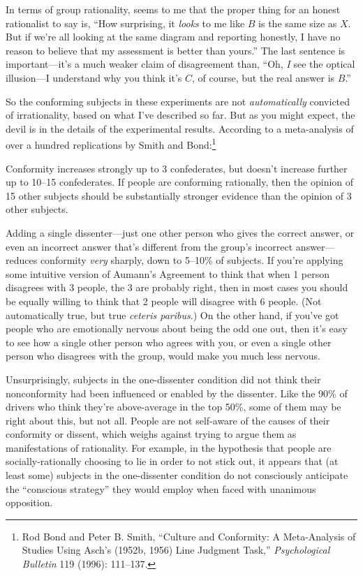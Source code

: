 {
 In terms of group rationality, seems to me that the proper thing
for an honest rationalist to say is, ``How surprising,
it \textit{looks} to me like $B$ is the same size as $X$. But if
we're all looking at the same diagram and reporting
honestly, I have no reason to believe that my assessment is better than
yours.'' The last sentence is
important---it's a much weaker claim of disagreement
than, ``Oh, \textit{I} see the optical illusion---I
understand why you think it's $C$, of course, but the
real answer is $B$.''}

{
 So the conforming subjects in these experiments are not
\textit{automatically} convicted of irrationality, based on what
I've described so far. But as you might expect, the
devil is in the details of the experimental results. According to a
meta-analysis of over a hundred replications by Smith and
Bond:\footnote{Rod Bond and Peter B. Smith, ``Culture and
Conformity: A Meta-Analysis of Studies Using Asch's
(1952b, 1956) Line Judgment Task,''
\textit{Psychological Bulletin} 119 (1996): 111--137.}}

{
 Conformity increases strongly up to 3 confederates, but
doesn't increase further up to 10--15 confederates. If
people are conforming rationally, then the opinion of 15 other subjects
should be substantially stronger evidence than the opinion of 3 other
subjects.}

{
 Adding a single dissenter---just one other person who gives the
correct answer, or even an incorrect answer that's
different from the group's incorrect answer---reduces
conformity \textit{very} sharply, down to 5--10\% of subjects. If
you're applying some intuitive version of
Aumann's Agreement to think that when 1 person
disagrees with 3 people, the 3 are probably right, then in most cases
you should be equally willing to think that 2 people will disagree with
6 people. (Not automatically true, but true \textit{ceteris paribus}.)
On the other hand, if you've got people who are
emotionally nervous about being the odd one out, then
it's easy to see how a single other person who agrees
with you, or even a single other person who disagrees with the group,
would make you much less nervous.}

{
 Unsurprisingly, subjects in the one-dissenter condition did not
think their nonconformity had been influenced or enabled by the
dissenter. Like the 90\% of drivers who think they're
above-average in the top 50\%, some of them may be right about this,
but not all. People are not self-aware of the causes of their
conformity or dissent, which weighs against trying to argue them as
manifestations of rationality. For example, in the hypothesis that
people are socially-rationally choosing to lie in order to not stick
out, it appears that (at least some) subjects in the one-dissenter
condition do not consciously anticipate the
``conscious strategy'' they would
employ when faced with unanimous opposition.}

